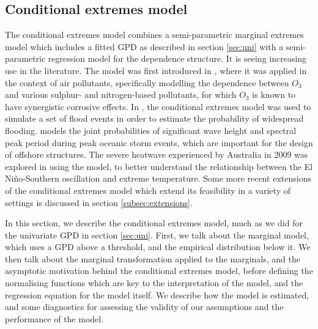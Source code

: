 \documentclass{article}
\numberwithin{equation}{section}
\begin{document}

\subsection{Conditional extremes model}


The conditional extremes model combines a semi-parametric marginal extremes model which includes a fitted GPD as described in section \ref{sec:uni} with a semi-parametric regression model for the dependence structure. 
It is seeing increasing use in the literature.
The model was first introduced in \citet{Heffernan2004}, where it was applied in the context of air pollutants, specifically modelling the dependence between $O_3$ and various sulphur- and nitrogen-based pollutants, for which $O_3$ is known to have synergistic corrosive effects. %
In \citet{Keef2012_flooding}, the conditional extremes model was used to simulate a set of flood events in order to estimate the probability of widespread flooding. %
\citet{Jonathan2013} models the joint probabilities of significant wave height and spectral peak period during peak oceanic storm events, which are important for the design of offshore structures. 
The severe heatwave experienced by Australia in 2009 was explored in \citet{Winter2016} using the model, to better understand the relationship between the El Niño-Southern oscillation and extreme temperature.
Some more recent extensions of the conditional extremes model which extend its feasibility in a variety of settings is discussed in section \ref{subsec:extensions}.

In this section, we describe the conditional extremes model, much as we did for the univariate GPD in section \ref{sec:uni}.
First, we talk about the marginal model, which uses a GPD above a threshold, and the empirical distribution below it. 
We then talk about the marginal transformation applied to the marginals, and the asymptotic motivation behind the conditional extremes model, before defining the normalising functions which are key to the interpretation of the model, and the regression equation for the model itself.
We describe how the model is estimated, and some diagnostics for assessing the validity of our assumptions and the performance of the model.
\end{document}
